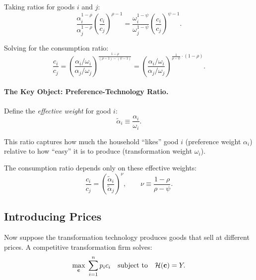 Taking ratios for goods $i$ and $j$:
\begin{equation}
\frac{\alpha_i^{1-\rho}}{\alpha_j^{1-\rho}} \left( \frac{c_i}{c_j} \right)^{\rho-1} = \frac{\omega_i^{1-\psi}}{\omega_j^{1-\psi}} \left( \frac{c_i}{c_j} \right)^{\psi-1}.
\label{eq:ac-iso-ratio}
\end{equation}

Solving for the consumption ratio:
\begin{equation}
\frac{c_i}{c_j} = \left( \frac{\alpha_i / \omega_i}{\alpha_j / \omega_j} \right)^{\frac{1-\rho}{(\rho-1)-(\psi-1)}} = \left( \frac{\alpha_i / \omega_i}{\alpha_j / \omega_j} \right)^{\frac{1}{\rho - \psi} \cdot (1-\rho)}.
\label{eq:ac-iso-cratio}
\end{equation}

\paragraph{The Key Object: Preference-Technology Ratio.}
Define the \emph{effective weight} for good $i$:
\begin{equation}
\tilde{\alpha}_i \equiv \frac{\alpha_i}{\omega_i}.
\label{eq:ac-iso-effective}
\end{equation}

This ratio captures how much the household ``likes'' good $i$ (preference weight $\alpha_i$) relative to how ``easy'' it is to produce (transformation weight $\omega_i$).

The consumption ratio depends only on these effective weights:
\begin{equation}
\frac{c_i}{c_j} = \left( \frac{\tilde{\alpha}_i}{\tilde{\alpha}_j} \right)^{\nu}, \qquad \nu \equiv \frac{1-\rho}{\rho - \psi}.
\label{eq:ac-iso-cratio-simple}
\end{equation}

\subsection{Introducing Prices}
\label{subsec:ac-iso-prices}

Now suppose the transformation technology produces goods that sell at different prices. A competitive transformation firm solves:
\begin{equation}
\max_{\mathbf{c}} \; \sum_{i=1}^{n} p_i c_i \quad \text{subject to} \quad \mathcal{H}(\mathbf{c}) = Y.
\label{eq:ac-iso-firm}
\end{equation}

